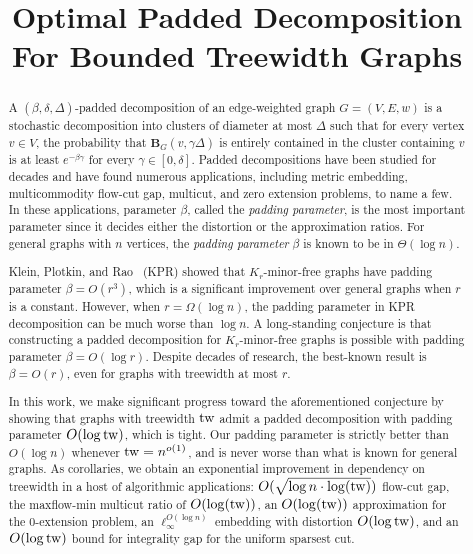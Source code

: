 \documentclass{theoretics}
\title{Optimal Padded Decomposition For Bounded Treewidth Graphs}
\newcommand{\tw}{{\rm tw}}
\def\ball{\mathbf{B}}
\begin{document}
\maketitle





\begin{abstract}
  A $(\beta,\delta,\Delta)$-padded decomposition of an edge-weighted graph $G = (V,E,w)$ is a stochastic decomposition into clusters of diameter at most $\Delta$ such that for every vertex $v\in V$, the probability that $\ball_G(v,\gamma\Delta)$ is entirely contained in the cluster containing $v$ is at least $e^{-\beta\gamma}$ for every $\gamma \in [0,\delta]$. Padded decompositions have been studied for decades and have found numerous applications, including metric embedding, multicommodity flow-cut gap, multicut, and zero extension problems, to name a few. In these applications, parameter $\beta$, called the \emph{padding parameter}, is the most important parameter since it decides either the distortion or the approximation ratios. For general graphs with $n$ vertices, the \emph{padding parameter} $\beta$ is known to be in $\Theta(\log n)$.
 
 Klein, Plotkin, and Rao~\cite{KPR93} (KPR) showed that $K_r$-minor-free graphs have padding parameter $\beta = O(r^3)$, which is a significant improvement over general graphs when $r$ is a constant. However, when $r= \Omega(\log n)$, the padding parameter in KPR decomposition can be much worse than $\log n$.  A long-standing conjecture is that constructing a padded
decomposition for $K_r$-minor-free graphs is possible with padding parameter $\beta = O(\log r)$. Despite decades of research, the best-known result is $\beta = O(r)$, even for graphs with treewidth at most $r$.

In this work, we make significant progress toward the aforementioned conjecture by showing that graphs with treewidth $\tw$ admit a padded decomposition with padding parameter $O(\log \tw)$, which is tight. Our padding parameter is strictly better than $O(\log n)$ whenever $\tw = n^{o(1)}$, and is never worse than what is known for general graphs. As corollaries, we obtain an exponential improvement in dependency on treewidth in a host of algorithmic applications: $O(\sqrt{ \log n \cdot \log(\tw)})$ flow-cut gap,  the maxflow-min multicut ratio of $O(\log(\tw))$, an $O(\log(\tw))$ approximation for the 0-extension problem, an $\ell^{O(\log n)}_\infty$ embedding with distortion $O(\log \tw)$, and an $O(\log \tw)$ bound for integrality gap for the uniform sparsest cut.
\end{abstract}
\end{document}
